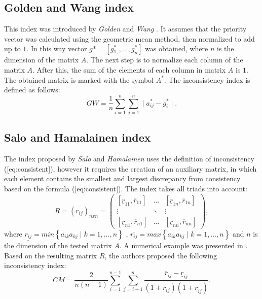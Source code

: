 \subsection{Golden and Wang index}

This index was introduced by \textit{Golden} and \textit{Wang} \cite{Golden1989}. It assumes that the priority vector was calculated using the geometric mean method, then normalized to add up to $1$. In this way vector $g*=[g{}_{1,}^{*},...,g_{n}^{*}]$ was obtained, where $n$ is the dimension of the matrix $A$. The next step is to normalize each column of the matrix $A$. After this, the sum of the elements of each column in matrix $A$ is $1$. The obtained matrix is marked with the symbol $A^{*}$. The inconsistency index is defined as follows:
	\begin{equation} 
		GW=\frac{1}{n}\sum_{i=1}^{n}\sum_{j=1}^{n}\mid a_{ij}^{*}-g_{i}^{*}\mid.
	 \end{equation}
 

\subsection{Salo and Hamalainen index}

The index proposed by \textit{Salo} and \textit{Hamalainen} \cite{SALO1995} uses the definition of inconsistency ([eq:consistent]), however it requires the creation of an auxiliary matrix, in which each element contains the smallest and largest discrepancy from consistency based on the formula ([eq:consistent]). The index takes all triads into account:
	\begin{equation} 
		R=(r_{ij})_{nxn}=\left(\begin{array}{ccc}
			[\underline{r}_{11},\overline{r}_{11}] & \ldots & [\underline{r}_{1n},\overline{r}_{1n}]\\
			\vdots & \ddots & \vdots\\{}
			[\underline{r}_{n1},\overline{r}_{n1}] & \ldots & [\underline{r}_{nn},\overline{r}_{nn}]
		\end{array}\right),
	\end{equation}
 where $\underline{r_{ij}}=min\left\{ a_{ik}a_{kj}\mid k=1,\ldots,n\right\}$ , $\overline{r_{ij}}=max\left\{ a_{ik}a_{kj}\mid k=1,\ldots,n\right\}$ and $n$ is the dimension of the tested matrix $A$. A numerical example was presented in \cite{Brunelli2015}. Based on the resulting matrix $R$, the authors proposed the following inconsistency index:
 	\begin{equation} 
		CM=\frac{2}{n(n-1)}\sum_{i=1}^{n-1}\sum_{j=i+1}^{n}\frac{\overline{r}_{ij}-\underline{r}_{ij}}{\left(1+\overline{r}_{ij}\right)\left(1+\underline{r}_{ij}\right)}.
	 \end{equation}
 

